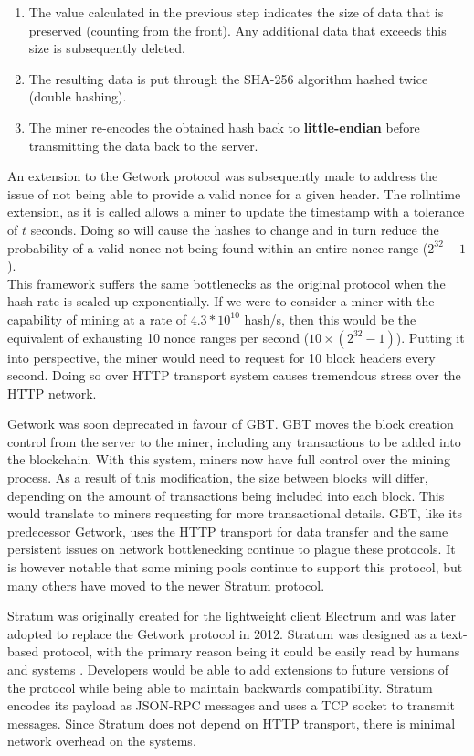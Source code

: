 \documentclass[a4paper,12pt]{article}
\newcounter{subsubsubsection}[subsubsection]
\begin{document}
{{{\begin{enumerate}
 	\item The value calculated in the previous step indicates the size of data that is preserved (counting from the front). Any additional data that exceeds this size is subsequently deleted.
 	\item The resulting data is put through the \textsc{SHA-256} algorithm hashed twice (double hashing).
 	\item The miner re-encodes the obtained hash back to \textbf{little-endian} before transmitting the data back to the server.
\end{enumerate}}
{\par \noindent An extension to the Getwork protocol was subsequently made to address the issue of not being able to provide a valid nonce for a given header. The rollntime extension, as it is called allows a miner to update the timestamp with a tolerance of $t$ seconds. Doing so will cause the hashes to change and in turn reduce the probability of a valid nonce not being found within an entire nonce range ($2^{32}-1$).\\\newline This framework suffers the same bottlenecks as the original protocol when the hash rate is scaled up exponentially. If we were to consider a miner with the capability of mining at a rate of $4.3*10^{10}$ hash/s, then this would be the equivalent of exhausting 10 nonce ranges per second ($10\times(2^{32}-1)$). Putting it into perspective, the miner would need to request for 10 block headers every second. Doing so over HTTP transport system causes tremendous stress over the HTTP network.}
{\par \noindent Getwork was soon deprecated in favour of \ac{GBT}. \ac{GBT} moves the block creation control from the server to the miner, including any transactions to be added into the blockchain. With this system, miners now have full control over the mining process. As a result of this modification, the size between blocks will differ, depending on the amount of transactions being included into each block. This would translate to miners requesting for more transactional details. \ac{GBT}, like its predecessor Getwork, uses the HTTP transport for data transfer and the same persistent issues on network bottlenecking continue to plague these protocols. It is however notable that some mining pools continue to support this protocol, but many others have moved to the newer Stratum protocol.}
{\par \noindent Stratum was originally created for the lightweight client Electrum and was later adopted to replace the Getwork protocol in 2012. Stratum was designed as a text-based protocol, with the primary reason being it could be easily read by humans and systems \cite{stratumprot}. Developers would be able to add extensions to future versions of the protocol while being able to maintain backwards compatibility. Stratum encodes its payload as JSON-\ac{RPC} messages and uses a \ac{TCP} socket to transmit messages. Since Stratum does not depend on HTTP transport, there is minimal network overhead on the systems.\\\newline
}}}
\end{document}
